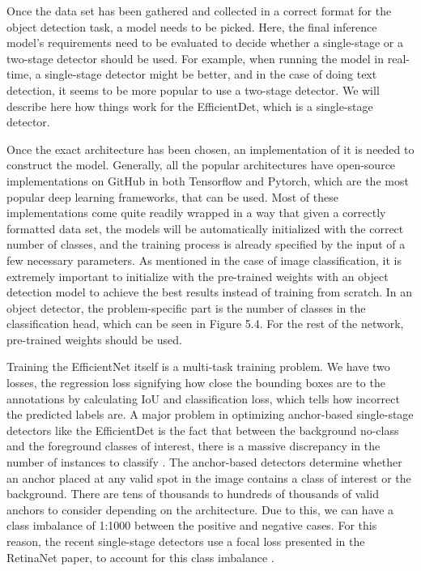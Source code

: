 Once the data set has been gathered and collected in a correct format for the object detection task, a model needs to be picked.
Here, the final inference model's requirements need to be evaluated to decide whether a single-stage or a two-stage detector should be used.
For example, when running the model in real-time, a single-stage detector might be better, and in the case of doing text detection, it seems to be more popular to use a two-stage detector.
We will describe here how things work for the EfficientDet, which is a single-stage detector.

Once the exact architecture has been chosen, an implementation of it is needed to construct the model.
Generally, all the popular architectures have open-source implementations on GitHub in both Tensorflow and Pytorch, which are the most popular deep learning frameworks, that can be used.
Most of these implementations come quite readily wrapped in a way that given a correctly formatted data set, the models will be automatically initialized with the correct number of classes, and the training process is already specified by the input of a few necessary parameters.
As mentioned in the case of image classification, it is extremely important to initialize with the pre-trained weights with an object detection model to achieve the best results instead of training from scratch.
In an object detector, the problem-specific part is the number of classes in the classification head, which can be seen in Figure 5.4.
For the rest of the network, pre-trained weights should be used.

Training the EfficientNet itself is a multi-task training problem. 
We have two losses, the regression loss signifying how close the bounding boxes are to the annotations by calculating IoU and classification loss, which tells how incorrect the predicted labels are.
A major problem in optimizing anchor-based single-stage detectors like the EfficientDet is the fact that between the background no-class and the foreground classes of interest, there is a massive discrepancy in the number of instances to classify \citep{retinaNet}.
The anchor-based detectors determine whether an anchor placed at any valid spot in the image contains a class of interest or the background. 
There are tens of thousands to hundreds of thousands of valid anchors to consider depending on the architecture. 
Due to this, we can have a class imbalance of 1:1000 between the positive and negative cases.
For this reason, the recent single-stage detectors use a focal loss presented in the RetinaNet paper, to account for this class imbalance \citep{retinaNet}.

